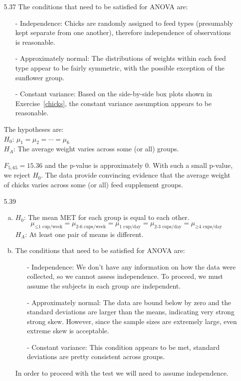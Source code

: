 \documentclass[11pt]{article}
\begin{document}
\begin{enumerate}
\item[5.37]
The conditions that need to be satisfied for ANOVA are:
\begin{itemize}
\item[-] Independence: Chicks are randomly assigned to feed types (presumably kept separate from one another), therefore independence of observations is reasonable.
\item[-] Approximately normal: The distributions of weights within each feed type appear to be fairly symmetric, with the possible exception of the sunflower group.
\item[-] Constant variance: Based on the side-by-side box plots shown in Exercise~\ref{chicks}, the constant variance assumption appears to be reasonable.
\end{itemize}

The hypotheses are: \\
$H_0$: $\mu_1 = \mu_2 = \cdots = \mu_6$ \\
$H_A$: The average weight varies across some (or all) groups.

$F_{5,65} = 15.36$ and the p-value is approximately 0. With such a small p-value, we reject $H_0$. The data provide convincing evidence that the average weight of chicks varies across some (or all) feed supplement groups.

%

\item[5.39]
\begin{enumerate}[(a)]
\item $H_0$: The mean MET for each group is equal to each other.
\[ \mu_{\le \text{1 cup/week}} = \mu_{\text{2-6 cups/week}} = \mu_{\text{1 cup/day}} = \mu_{\text{2-3 cups/day}} = \mu_{\ge \text{4 cups/day}} \]
$H_A$: At least one pair of means is different.

\item The conditions that need to be satisfied for ANOVA are:
\begin{itemize}
\item[-] Independence: We don't have any information on how the data were collected, so we cannot assess independence. To proceed, we must assume the subjects in each group are independent.
\item[-] Approximately normal: The data are bound below by zero and the standard deviations are larger than the means, indicating very strong strong skew. However, since the sample sizes are extremely large, even extreme skew is acceptable.
\item[-] Constant variance: This condition appears to be met, standard deviations are pretty consistent across groups.
\end{itemize}
In order to proceed with the test we will need to assume independence. 


\end{enumerate}
\end{enumerate}
\end{document}
